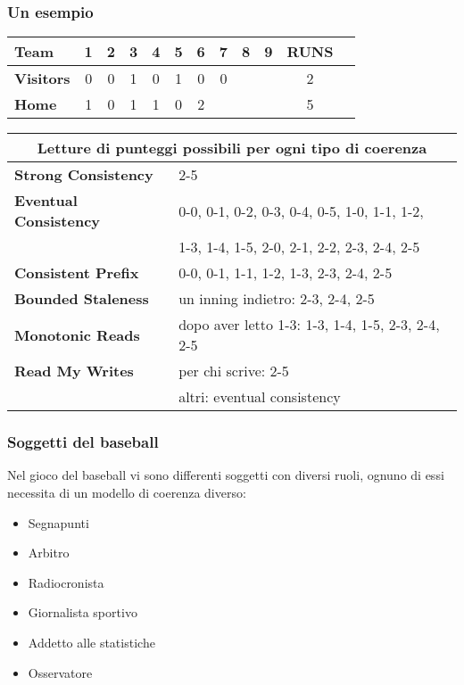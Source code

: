 \begin{frame}
\frametitle{Un esempio}  
\begin{center}
 \begin{tabular}{l*{10}{c}r}
  \textbf{Team}              & \textbf{1} & \textbf{2} & \textbf{3} & \textbf{4} & \textbf{5} & \textbf{6} & \textbf{7} & \textbf{8} & \textbf{9} & \textbf{RUNS} \\
 \hline
  \textbf{Visitors}     & 0 & 0 & 1 & 0 & 1 & 0 & 0 &  &  & 2 \\
  \textbf{Home}         & 1 & 0 & 1 & 1 & 0 & 2 &   &  &  & 5 \\
 \end{tabular}
\end{center}

\begin{center}
 \begin{tabular}{ |l|l| }
  \hline
  \multicolumn{2}{|c|}{Letture di punteggi possibili per ogni tipo di coerenza} \\
  \hline
  \textbf{Strong Consistency}   & 2-5 \\
  \hline
  \textbf{Eventual Consistency} & 0-0, 0-1, 0-2, 0-3, 0-4, 0-5, 1-0, 1-1, 1-2,\\
                                & 1-3, 1-4, 1-5, 2-0, 2-1, 2-2, 2-3, 2-4, 2-5 \\
  \hline
  \textbf{Consistent Prefix}    & 0-0, 0-1, 1-1, 1-2, 1-3, 2-3, 2-4, 2-5 \\
  \hline
  \textbf{Bounded Staleness}    & un inning indietro: 2-3, 2-4, 2-5 \\
  \hline  
  \textbf{Monotonic Reads}      & dopo aver letto 1-3: 1-3, 1-4, 1-5, 2-3, 2-4, 2-5 \\
  \hline  
  \textbf{Read My Writes}       & per chi scrive: 2-5 \\
                                & altri: eventual consistency \\
  \hline
 \end{tabular}
\end{center}
\end{frame}

\begin{frame}
 \frametitle{Soggetti del baseball}
 Nel gioco del baseball vi sono differenti soggetti con diversi ruoli, ognuno di essi necessita di un modello di coerenza diverso:\\
 \begin{itemize}
   \item Segnapunti
   \item Arbitro
   \item Radiocronista
   \item Giornalista sportivo
   \item Addetto alle statistiche
   \item Osservatore
 \end{itemize}
\end{frame}

